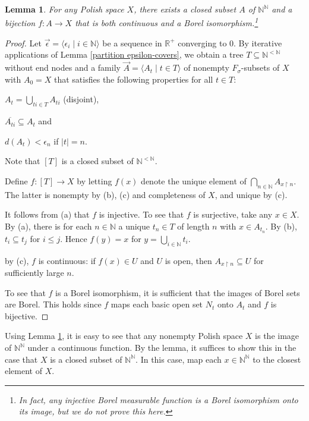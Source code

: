 \documentclass[10pt]{amsart}
\newcommand{\RR}{\mathbb{R}}
\newcommand{\NN}{\mathbb{N}}
\newtheorem{lemma}[theorem]{Lemma}
\theoremstyle{definition}
\theoremstyle{remark}
\newenvironment{enumerate-(a)}{\begin{enumerate}[label={\upshape (\alph*)}, leftmargin=2pc]}{\end{enumerate}}
\begin{document}
\begin{lemma} \label{Polish space as continuous image} 
For any Polish space $X$, there exists a closed subset $A$ of $\NN^\NN$ and a bijection $f\colon A\rightarrow X$ that is both continuous and a Borel isomorphism.\footnote{In fact, any injective Borel measurable function is a Borel isomorphism onto its image, but we do not prove this here. } 
\end{lemma} 
\begin{proof} 
Let $\vec{\epsilon}=\langle \epsilon_i \mid i\in\NN\rangle$ be a sequence in $\RR^+$ converging to $0$. 
By iterative applications of Lemma \ref{partition epsilon-covers}, we obtain a tree $T\subseteq \NN^{<\NN}$ without end nodes and a family $\vec{A}=\langle A_t\mid t\in T\rangle$ of nonempty $F_\sigma$-subsets of $X$ with $A_0=X$ that satisfies the following properties for all $t\in T$: 
\begin{enumerate-(a)} 
\item 
$A_t=\bigcup_{ti \in T} A_{ti}$ (disjoint), 
\item 
$\overline{A_{ti}} \subseteq A_t$ and 
\item 
$d(A_t)<\epsilon_n$ if $|t|=n$. 
\end{enumerate-(a)} 

Note that $[T]$ is a closed subset of $\NN^{<\NN}$. 

Define $f\colon [T]\rightarrow X$ by letting $f(x)$ denote the unique element of $\bigcap_{n\in\NN} A_{x\upharpoonright n}$. 
The latter is nonempty by (b), (c) and completeness of $X$, and unique by (c). 

It follows from (a) that $f$ is injective. 
To see that $f$ is surjective, take any $x\in X$. 
By (a), there is for each $n\in\NN$ a unique $t_n\in T$ of length $n$ with $x\in A_{t_n}$. 
By (b), $t_i\subseteq t_j$ for $i\leq j$. 
Hence $f(y)=x$ for $y=\bigcup_{i\in\NN} t_i$. 

by (c), $f$ is continuous: if $f(x)\in U$ and $U$ is open, then $A_{x{\upharpoonright}n}\subseteq U$ for sufficiently large $n$. 

To see that $f$ is a Borel isomorphism, it is sufficient that the images of Borel sets are Borel. 
This holds since $f$ maps each basic open set $N_t$ onto $A_t$ and $f$ is bijective. 
\end{proof} 

Using Lemma \ref{Polish space as continuous image}, it is easy to see that any nonempty Polish space $X$ is the image of $\NN^\NN$ under a continuous function. 
By the lemma, it suffices to show this in the case that $X$ is a closed subset of $\NN^\NN$. In this case, map each $x\in \NN^\NN$ to the closest element of $X$. 
\end{document}
